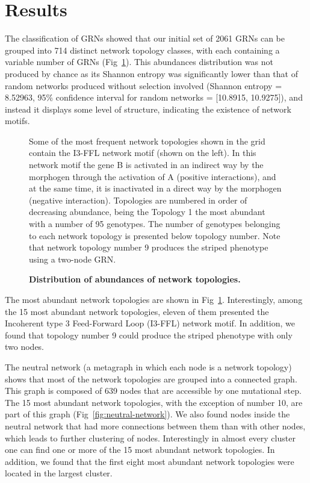 \documentclass[10pt,letterpaper]{article}
\begin{document}
\section*{Results}

The classification of GRNs showed that our initial set of 2061 GRNs can be
grouped into 714 distinct network topology classes, with each containing a
variable number of GRNs (Fig~\ref{fig:distopol}). This abundances
distribution was not produced by chance as its Shannon entropy was
significantly lower than that of random networks produced without
selection involved (Shannon entropy = 8.52963, 95\%
confidence interval for random networks = [10.8915, 10.9275]), and
instead it displays some level of structure, indicating the existence
of network motifs.

\begin{figure}[!h]
 \caption{\bf Distribution of abundances of network topologies.}
 Some of the most frequent network topologies shown in the grid
 contain the I3-FFL network motif (shown on the left). In this network
 motif the gene B is activated in an indirect way by the morphogen through
 the activation of A (positive interactions), and at the same time, it
 is inactivated in a direct way by the morphogen (negative interaction).
 Topologies are numbered in order of decreasing abundance, being the
 Topology 1 the most abundant with a number of 95 genotypes. The number of
 genotypes belonging to each network topology is presented below
 topology number.
 Note that network topology number 9 produces the striped phenotype using a
 two-node GRN.
 \label{fig:distopol}
\end{figure}

The most abundant network topologies are shown in Fig~\ref{fig:distopol}.
Interestingly, among the 15 most abundant network topologies, eleven of them
presented the Incoherent type 3 Feed-Forward Loop (I3-FFL) network motif. In
addition, we found that topology number 9 could produce the striped phenotype
with only two nodes.

The neutral network (a metagraph in which each node is a network topology)
shows that most of the network topologies are grouped into a connected graph.
This graph is composed of 639 nodes that are accessible by one mutational step.
The 15 most abundant network topologies, with the exception of
number 10, are part of this graph (Fig~\ref{fig:neutral-network}). We also
found nodes inside the neutral network that had more connections between them
than with other nodes, which leads to further clustering of nodes. Interestingly in
almost every cluster one can find one or more of the 15 most abundant network
topologies. In addition, we found that the first eight most abundant network
topologies were located in the largest cluster.
\end{document}

